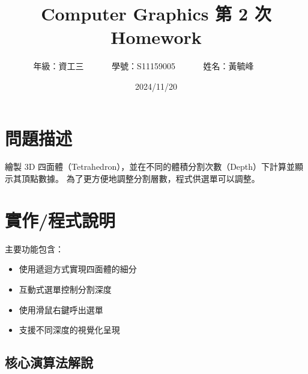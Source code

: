 \documentclass[12pt,a4paper]{article}
\begin{document}
\title{
  {
    \heiti Computer Graphics 第 2 次 Homework
  }
}


\date{2024/11/20}
\author{
  年級：{資工三}~~~~~~
  學號：{S11159005}~~~~~~
  姓名：{黃毓峰}~~~~~~
}

\maketitle
\newlength{\question}
\settowidth{\question}{XX}

\section*{{問題描述}}
繪製 3D 四面體（Tetrahedron），並在不同的體積分割次數（Depth）下計算並顯示其頂點數據。
為了更方便地調整分割層數，程式供選單可以調整。

\section*{實作/程式說明}

\noindent 主要功能包含：

\begin{itemize}
  \item 使用遞迴方式實現四面體的細分
  \item 互動式選單控制分割深度
  \item 使用滑鼠右鍵呼出選單
  \item 支援不同深度的視覺化呈現
\end{itemize}

\subsection*{核心演算法解說}
\end{document}
